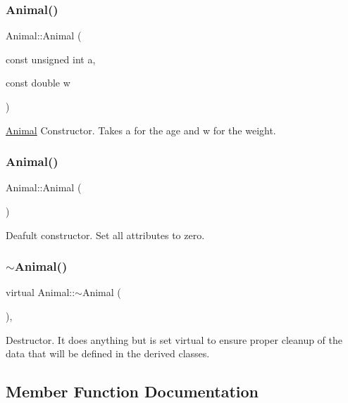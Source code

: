 \subsubsection{\texorpdfstring{Animal()}{Animal()}\hspace{0.1cm}{\footnotesize\ttfamily [1/2]}}
{\footnotesize\ttfamily Animal\+::\+Animal (\begin{DoxyParamCaption}\item[{const unsigned int}]{a,  }\item[{const double}]{w }\end{DoxyParamCaption})}

\hyperlink{classAnimal}{Animal} Constructor. Takes {\ttfamily a} for the age and {\ttfamily w} for the weight. \mbox{\label{classAnimal_a1e726a49ec952443190ac62dad22353c}} 
\subsubsection{\texorpdfstring{Animal()}{Animal()}\hspace{0.1cm}{\footnotesize\ttfamily [2/2]}}
{\footnotesize\ttfamily Animal\+::\+Animal (\begin{DoxyParamCaption}{ }\end{DoxyParamCaption})}

Deafult constructor. Set all attributes to zero. \mbox{\label{classAnimal_a16d8b7f94611cc65f5cdb58cc105527b}} 
\subsubsection{\texorpdfstring{$\sim$\+Animal()}{~Animal()}}
{\footnotesize\ttfamily virtual Animal\+::$\sim$\+Animal (\begin{DoxyParamCaption}{ }\end{DoxyParamCaption})\hspace{0.3cm}{\ttfamily [inline]}, {\ttfamily [virtual]}}

Destructor. It does anything but is set virtual to ensure proper cleanup of the data that will be defined in the derived classes. 

\subsection{Member Function Documentation}
\mbox{\label{classAnimal_a72994a2bb769667d277845351462246f}} 
